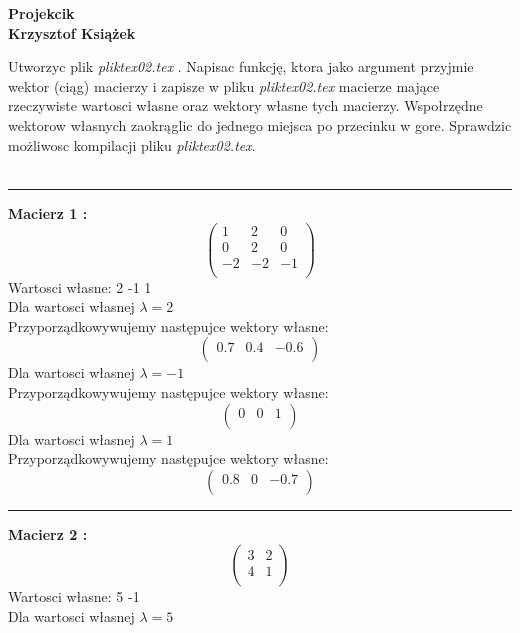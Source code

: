 \documentclass[10pt,a4paper]{article}
\begin{document}
\begin{LARGE}
\begin{center}\textbf{Projekcik}\\ \textbf{Krzysztof Ksi\k{a}\.zek}\end{center}
\end{LARGE}Utworzyc plik \textit{pliktex02.tex} . Napisac funkcj\k{e}, ktora jako argument przyjmie wektor (ci\k{a}g) macierzy i zapisze w pliku \textit{pliktex02.tex} macierze maj\k{a}ce rzeczywiste wartosci w\l{}asne oraz wektory w\l{}asne tych macierzy. Wspo\l{}rz\k{e}dne wektorow w\l{}asnych zaokr\k{a}glic do jednego miejsca po przecinku w gore. Sprawdzic mo\.zliwosc kompilacji pliku \textit{pliktex02.tex}.\\ \\
\noindent\rule[0.5cm]{\textwidth}{1pt}
\textbf{Macierz  1 :}\\
$$\begin{pmatrix} 1 & 2 & 0 \\ 0 & 2 & 0 \\ -2 & -2 & -1 \\ \end{pmatrix}$$
Wartosci w\l{}asne: 2 -1 1 \\Dla wartosci w\l{}asnej  $\lambda =  2 $ \\
Przyporz\k{a}dkowywujemy nast\k{e}pujce wektory w\l{}asne: \
$$ \begin{pmatrix}  0.7 & 0.4 & -0.6 \\ \end{pmatrix}$$
Dla wartosci w\l{}asnej  $\lambda =  -1 $ \\
Przyporz\k{a}dkowywujemy nast\k{e}pujce wektory w\l{}asne: \
$$ \begin{pmatrix}  0 & 0 & 1 \\ \end{pmatrix}$$
Dla wartosci w\l{}asnej  $\lambda =  1 $ \\
Przyporz\k{a}dkowywujemy nast\k{e}pujce wektory w\l{}asne: \
$$ \begin{pmatrix}  0.8 & 0 & -0.7 \\ \end{pmatrix}$$
\noindent\rule[0.5cm]{\textwidth}{1pt}
\textbf{Macierz  2 :}\\
$$\begin{pmatrix} 3 & 2 \\ 4 & 1 \\ \end{pmatrix}$$
Wartosci w\l{}asne: 5 -1 \\Dla wartosci w\l{}asnej  $\lambda =  5 $ \\
\end{document}
